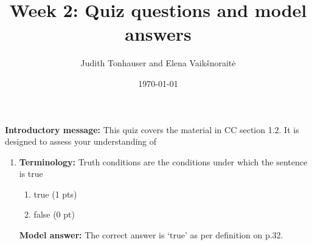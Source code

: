 \documentclass[a4,11pt]{article}
\title{Week 2: Quiz questions and model answers}
\author{Judith Tonhauser and Elena Vaik\v snorait\.{e} }
\date{\today}
\begin{document}
\maketitle

{\bf Introductory message:} This quiz covers the material in CC section 1.2. It is designed to assess your understanding of 

\begin{enumerate}[leftmargin = 12pt]

   \item {\bf Terminology:}  Truth conditions are the conditions under which the sentence is true
      \begin{enumerate}[noitemsep]
       \item true (1 pts)
        \item false (0 pt)
   \end{enumerate}
   
   {\bf Model answer:} The correct answer is `true' as per definition on p.32.
 
 \end{enumerate}
\end{document}
